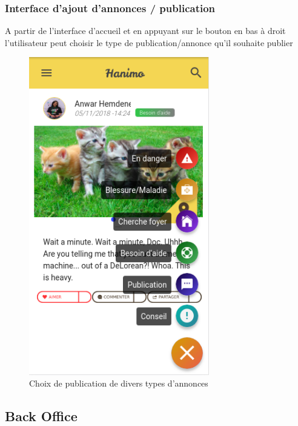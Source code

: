 \documentclass[11pt,a4paper,oneside]{book}
\begin{document}
					\subsubsection{Interface d’ajout d’annonces / publication}
					A partir de l’interface d'accueil et en appuyant sur le bouton en bas à droit l’utilisateur peut choisir le type de publication/annonce qu’il souhaite publier
					\begin{figure}[H]
						\centering
						\includegraphics[width=0.7\textwidth]{Images/ch4/home1}
						\caption{Choix de publication de divers types d'annonces}
						\label{fig:06-home-feed-with-fab-expanded}
					\end{figure}
				\vfill
				
					\subsection{Back Office}
\end{document}
